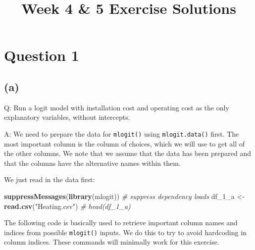 \documentclass[
]{article}
\title{Week 4 \& 5 Exercise Solutions}
\author{}
\date{\vspace{-2.5em}}
\newenvironment{Shaded}{\begin{snugshade}}{\end{snugshade}}
\newcommand{\CommentTok}[1]{\textcolor[rgb]{0.56,0.35,0.01}{\textit{#1}}}
\newcommand{\DecValTok}[1]{\textcolor[rgb]{0.00,0.00,0.81}{#1}}
\newcommand{\KeywordTok}[1]{\textcolor[rgb]{0.13,0.29,0.53}{\textbf{#1}}}
\newcommand{\NormalTok}[1]{#1}
\newcommand{\StringTok}[1]{\textcolor[rgb]{0.31,0.60,0.02}{#1}}
\begin{document}
\maketitle

\hypertarget{question-1}{%
\section{Question 1}\label{question-1}}

\hypertarget{onea}{%
\subsection{(a)}\label{onea}}

Q: Run a logit model with installation cost and operating cost as the
only explanatory variables, without intercepts.

A: We need to prepare the data for \texttt{mlogit()} using
\texttt{mlogit.data()} first. The most important column is the column of
choices, which we will use to get all of the other columns. We note that
we assume that the data has been prepared and that the columns have the
alternative names within them.

We just read in the data first:

\begin{Shaded}
\begin{Highlighting}[]
\KeywordTok{suppressMessages}\NormalTok{(}\KeywordTok{library}\NormalTok{(mlogit))  }\CommentTok{# suppress dependency loads}
\NormalTok{df_}\DecValTok{1}\NormalTok{_a <-}\StringTok{ }\KeywordTok{read.csv}\NormalTok{(}\StringTok{"Heating.csv"}\NormalTok{)}
\CommentTok{# head(df_1_a)}
\end{Highlighting}
\end{Shaded}

The following code is basically used to retrieve important column names
and indices from possible \texttt{mlogit()} inputs. We do this to try to
avoid hardcoding in column indices. These commands will minimally work
for this exercise.
\end{document}
